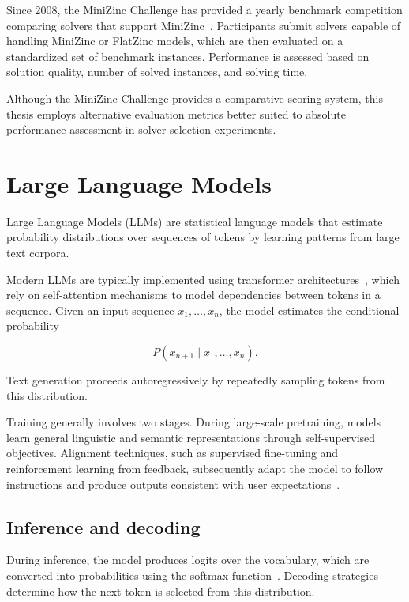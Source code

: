\documentclass[../../main]{subfiles}
\begin{document}
Since 2008, the MiniZinc Challenge has provided a yearly benchmark competition comparing solvers that support MiniZinc~\cite{PhilMznChallenge}. Participants submit solvers capable of handling MiniZinc or FlatZinc models, which are then evaluated on a standardized set of benchmark instances. Performance is assessed based on solution quality, number of solved instances, and solving time.

Although the MiniZinc Challenge provides a comparative scoring system, this thesis employs alternative evaluation metrics better suited to absolute performance assessment in solver-selection experiments.

\section{Large Language Models}
\label{sec:LLM}

Large Language Models (LLMs) are statistical language models that estimate probability distributions over sequences of tokens by learning patterns from large text corpora.

Modern LLMs are typically implemented using transformer architectures~\cite{TransformerArchitecture}, which rely on self-attention mechanisms to model dependencies between tokens in a sequence. Given an input sequence \(x_1, \dots, x_n\), the model estimates the conditional probability

\[
P(x_{n+1} \mid x_1, \dots, x_n).
\]

Text generation proceeds autoregressively by repeatedly sampling tokens from this distribution.

Training generally involves two stages. During large-scale pretraining, models learn general linguistic and semantic representations through self-supervised objectives. Alignment techniques, such as supervised fine-tuning and reinforcement learning from feedback, subsequently adapt the model to follow instructions and produce outputs consistent with user expectations~\cite{LLMsIBM}.

\subsection{Inference and decoding}

During inference, the model produces logits over the vocabulary, which are converted into probabilities using the softmax function~\cite{InfeerenceTrainingLLMs}. Decoding strategies determine how the next token is selected from this distribution.
\end{document}
